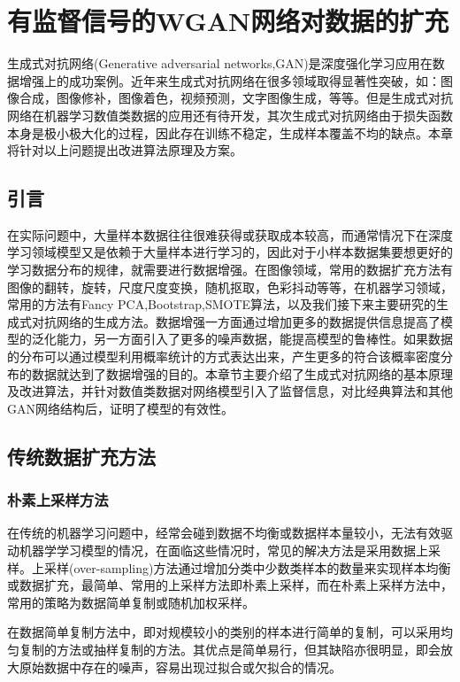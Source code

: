 \chapter{有监督信号的WGAN网络对数据的扩充}
生成式对抗网络(Generative adversarial networks,GAN)\cite{Goodfellow2017NIPS}是深度强化学习应用在数据增强上的成功案例。近年来生成式对抗网络在很多领域取得显著性突破，如：图像合成，图像修补，图像着色，视频预测，文字图像生成，等等。但是生成式对抗网络在机器学习数值类数据的应用还有待开发，其次生成式对抗网络由于损失函数本身是极小极大化的过程，因此存在训练不稳定，生成样本覆盖不均的缺点。本章将针对以上问题提出改进算法原理及方案。
\section{引言}
在实际问题中，大量样本数据往往很难获得或获取成本较高，而通常情况下在深度学习领域模型又是依赖于大量样本进行学习的，因此对于小样本数据集要想更好的学习数据分布的规律，就需要进行数据增强。在图像领域，常用的数据扩充方法有图像的翻转，旋转，尺度尺度变换，随机抠取，色彩抖动等等，在机器学习领域，常用的方法有Fancy PCA\cite{Holdt2010Genome},Bootstrap,SMOTE算法，以及我们接下来主要研究的生成式对抗网络的生成方法。数据增强一方面通过增加更多的数据提供信息提高了模型的泛化能力，另一方面引入了更多的噪声数据，能提高模型的鲁棒性。如果数据的分布可以通过模型利用概率统计的方式表达出来，产生更多的符合该概率密度分布的数据就达到了数据增强的目的。本章节主要介绍了生成式对抗网络的基本原理及改进算法，并针对数值类数据对网络模型引入了监督信息，对比经典算法和其他GAN网络结构后，证明了模型的有效性。
\section{传统数据扩充方法}
\subsection{朴素上采样方法}
在传统的机器学习问题中，经常会碰到数据不均衡或数据样本量较小，无法有效驱动机器学学习模型的情况，在面临这些情况时，常见的解决方法是采用数据上采样。上采样(over-sampling)方法通过增加分类中少数类样本的数量来实现样本均衡或数据扩充，最简单、常用的上采样方法即朴素上采样，而在朴素上采样方法中，常用的策略为数据简单复制或随机加权采样。

在数据简单复制方法中，即对规模较小的类别的样本进行简单的复制，可以采用均匀复制的方法或抽样复制的方法。其优点是简单易行，但其缺陷亦很明显，即会放大原始数据中存在的噪声，容易出现过拟合或欠拟合的情况。

